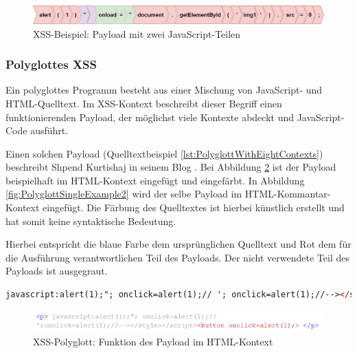 		\begin{figure}[htbp] 
			\centering
			\includegraphics[width=\textwidth]{contents/images/PayloadExample}
			\caption{XSS-Beispiel: Payload mit zwei JavaScript-Teilen}
			\label{fig:PayloadExample}
		\end{figure}
		
\subsubsection{Polyglottes \ac{XSS}}
		
		Ein polyglottes Programm besteht aus einer Mischung von JavaScript- und HTML-Quelltext. Im \ac{XSS}-Kontext beschreibt dieser Begriff einen funktionierenden Payload, der möglichst viele Kontexte abdeckt und JavaScript-Code ausführt.
		
		Einen solchen Payload (Quelltextbeispiel \ref{lst:PolyglottWithEightContexts}) beschreibt Shpend Kurtishaj in seinem Blog \cite{Kurtishaj2016}. Bei Abbildung \ref{fig:PolyglottSingleExample} ist der Payload beispielhaft im HTML-Kontext eingefügt und eingefärbt. In Abbildung \ref{fig:PolyglottSingleExample2} wird der selbe Payload im HTML-Kommantar-Kontext eingefügt. Die Färbung des Quelltextes ist hierbei künstlich erstellt und hat somit keine syntaktische Bedeutung.
		
		Hierbei entspricht die blaue Farbe dem ursprünglichen Quelltext und Rot dem für die Ausführung verantwortlichen Teil des Payloads. Der nicht verwendete Teil des Payloads ist ausgegraut.
		
\begin{lstlisting}[language=HTML,caption={XSS-Angriffe: Polyglott-Payload über acht Kontexte},label=lst:PolyglottWithEightContexts]
javascript:alert(1);"; onclick=alert(1);// '; onclick=alert(1);//--></style></script><button onclick=alert(1);>
\end{lstlisting}
		
		\begin{figure}[htbp] 
			\centering
			\includegraphics[width=\textwidth]{contents/images/PolyglottSingleExample}
			\caption{XSS-Polyglott: Funktion des Payload im HTML-Kontext}
			\label{fig:PolyglottSingleExample}
		\end{figure}
		
